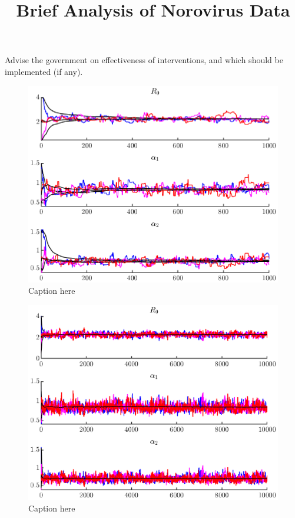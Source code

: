 \documentclass{X:/Documents/Coding/Latex/myreport}
\title{Brief Analysis of Norovirus Data}
\begin{document}
\maketitle
Advise the government on effectiveness of interventions, and which should be implemented (if any). 


\begin{figure}[tb]
	\centering
	\includegraphics[width=\linewidth]{MHplot1.eps}
	\caption{Caption here}
	\label{fig:fullrun}
\end{figure}

\begin{figure}[tb]
	\centering
	\includegraphics[width=\linewidth]{MHplot0.eps}
	\caption{Caption here}
	\label{fig:burnin}
\end{figure}
\end{document}
